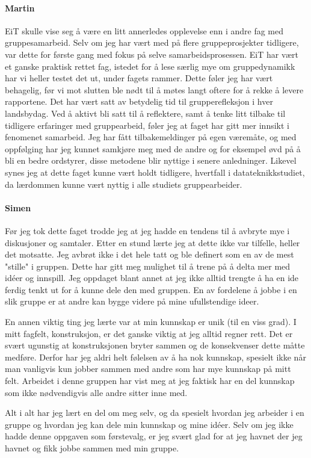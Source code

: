 \paragraph{Martin}
EiT skulle vise seg å være en litt annerledes opplevelse enn i andre fag med gruppesamarbeid.
Selv om jeg har vært med på flere gruppeprosjekter tidligere, var dette for første gang med fokus på selve samarbeidsprosessen.
EiT har vært et ganske praktisk rettet fag, istedet for å lese særlig mye om gruppedynamikk har vi heller testet det ut, under fagets rammer.
Dette føler jeg har vært behagelig, før vi mot slutten ble nødt til å møtes langt oftere for å rekke å levere rapportene.
Det har vært satt av betydelig tid til grupperefleksjon i hver landsbydag.
Ved å aktivt bli satt til å reflektere, samt å tenke litt tilbake til tidligere erfaringer med gruppearbeid, føler jeg at faget har gitt mer innsikt i fenomenet samarbeid.
Jeg har fått tilbakemeldinger på egen væremåte, og med oppfølging har jeg kunnet samkjøre meg med de andre og for eksempel øvd på å bli en bedre ordstyrer, disse metodene blir nyttige i senere anledninger.
Likevel synes jeg at dette faget kunne vært holdt tidligere, hvertfall i datateknikkstudiet, da lærdommen kunne vært nyttig i alle studiets gruppearbeider.

\paragraph{Simen}
Før jeg tok dette faget trodde jeg at jeg hadde en tendens til å avbryte mye i diskusjoner og samtaler.
Etter en stund lærte jeg at dette ikke var tilfelle, heller det motsatte.
Jeg avbrøt ikke i det hele tatt og ble definert som en av de mest "stille" i gruppen.
Dette har gitt meg mulighet til å trene på å delta mer med id\'{e}er og innspill.
Jeg oppdaget blant annet at jeg ikke alltid trengte å ha en ide ferdig tenkt ut for å kunne dele den med gruppen.
En av fordelene å jobbe i en slik gruppe er at andre kan bygge videre på mine ufullstendige ideer.

En annen viktig ting jeg lærte var at min kunnskap er unik (til en viss grad).
I mitt fagfelt, konstruksjon, er det ganske viktig at jeg alltid regner rett.
Det er svært ugunstig at konstruksjonen bryter sammen og de konsekvenser dette måtte medføre.
Derfor har jeg aldri helt følelsen av å ha nok kunnskap, spesielt ikke når man vanligvis kun jobber sammen med andre som har mye kunnskap på mitt felt.
Arbeidet i denne gruppen har vist meg at jeg faktisk har en del kunnskap som ikke nødvendigvis alle andre sitter inne med.

Alt i alt har jeg lært en del om meg selv, og da spesielt hvordan jeg arbeider i en gruppe og hvordan jeg kan dele min kunnskap og mine id\'{e}er.
Selv om jeg ikke hadde denne oppgaven som førstevalg, er jeg svært glad for at jeg havnet der jeg havnet og fikk jobbe sammen med min gruppe.
